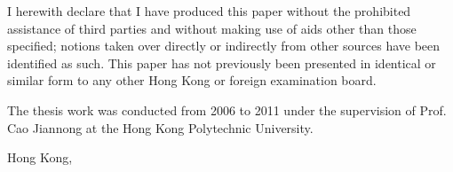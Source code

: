 


\begin{declaration}        %

I herewith declare that I have produced this paper without the prohibited assistance of third parties and without making use of aids other than those specified; notions taken over directly or indirectly from other sources have been identified as such. This paper has not previously been presented in identical or similar form to any other Hong Kong or foreign examination board.

The thesis work was conducted from 2006 to 2011 under the supervision of Prof. Cao Jiannong at the Hong Kong Polytechnic University.

\vspace{10mm}

Hong Kong,


\end{declaration}


